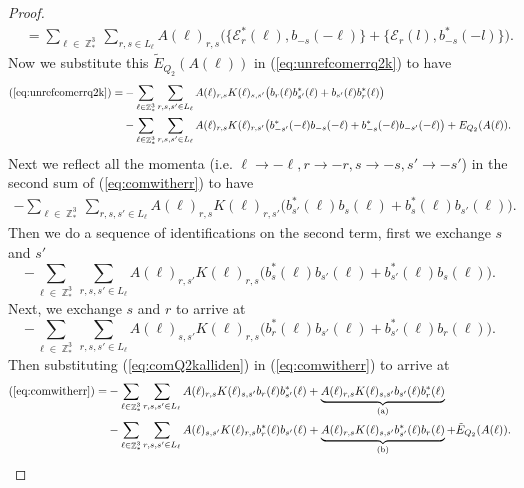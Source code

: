 \documentclass[sn-mathphys,Numbered, a4paper ,nocrop]{sn-jnl}%
\DeclareMathOperator{\Z}{\mathbb{Z}}
\theoremstyle{plain}
\theoremstyle{definition}
\theoremstyle{remark}
\theoremstyle{plain}
\theoremstyle{definition}
\theoremstyle{remark}
\begin{document}
\begin{proof}
\begin{align}
    &=\sum\limits_{\ell \in \Z^3_*}\sum\limits_{r,s \in L_{\ell}}A(\ell)_{r,s}\Big(\big\{\mathcal{E}^*_{r}(\ell), b_{-s}(-\ell)\big\} + \big\{\mathcal{E}_r(l), b^*_{-s}(-l)\big\}\Big).
\end{align}
Now we substitute this $\tilde E_{Q_2}(A(\ell)) $ in (\ref{eq:unrefcomerrq2k}) to have
\begin{align}
    (\ref{eq:unrefcomerrq2k})=&-\sum\limits_{\ell \in \Z^3_*}\sum\limits_{r,s,s' \in L_{\ell}}A(\ell)_{r,s}
        K(\ell)_{s,s'}\big(b_{r}(\ell)b^*_{s'}(\ell)+b_{s'}(\ell)b^*_{r}(\ell) \big)\nonumber\\ &-\sum\limits_{\ell \in \Z^3_*}\sum\limits_{r,s,s' \in L_{\ell}}A(\ell)_{r,s} K(\ell)_{r,s'}\big(b^*_{-s'}(-\ell)b_{-s}(-\ell) + b^*_{-s}(-\ell)b_{-s'}(-\ell)\big) + E_{Q_2}(A(\ell)).\label{eq:comwitherr}
\end{align}
Next we reflect all the momenta (i.e. $\ell\rightarrow -\ell,r\rightarrow -r,s\rightarrow -s,s'\rightarrow -s'$) in the second sum of (\ref{eq:comwitherr}) to have
\begin{align}
   -\sum\limits_{\ell \in \Z^3_*}\sum\limits_{r,s,s' \in L_{\ell}}A(\ell)_{r,s} K(\ell)_{r,s'}\big(b^*_{s'}(\ell)b_{s}(\ell) + b^*_{s}(\ell)b_{s'}(\ell)\big).
\end{align}
Then we do a sequence of identifications on the second term, first we exchange $s$ and $s'$ 
\begin{equation}
   -\sum\limits_{\ell \in \Z^3_*}\sum\limits_{r,s,s' \in L_{\ell}}A(\ell)_{r,s'} K(\ell)_{r,s}\big(b^*_{s}(\ell)b_{s'}(\ell) + b^*_{s'}(\ell)b_{s}(\ell)\big).
\end{equation}
Next, we exchange $s$ and $r$ to arrive at
\begin{equation}\label{eq:comQ2kalliden}
   -\sum\limits_{\ell \in \Z^3_*}\sum\limits_{r,s,s' \in L_{\ell}}A(\ell)_{s,s'} K(\ell)_{r,s}\big(b^*_{r}(\ell)b_{s'}(\ell) + b^*_{s'}(\ell)b_{r}(\ell)\big).
\end{equation}
Then substituting (\ref{eq:comQ2kalliden}) in (\ref{eq:comwitherr}) to arrive at
\begin{align}
    (\ref{eq:comwitherr})=&-\sum\limits_{\ell \in \Z^3_*}\sum\limits_{r,s,s' \in L_{\ell}}A(\ell)_{r,s}
        K(\ell)_{s,s'}b_{r}(\ell)b^*_{s'}(\ell)+\underbrace{A(\ell)_{r,s}
        K(\ell)_{s,s'}b_{s'}(\ell)b^*_{r}(\ell)}_{\text{(a)}}\nonumber\\ &-\sum\limits_{\ell \in \Z^3_*}\sum\limits_{r,s,s' \in L_{\ell}}A(\ell)_{s,s'} K(\ell)_{r,s}b^*_{r}(\ell)b_{s'}(\ell) + \underbrace{A(\ell)_{r,s}
        K(\ell)_{s,s'}b^*_{s'}(\ell)b_{r}(\ell)}_{\text{(b)}} + \tilde E_{Q_2}(A(\ell)).\label{eq:Q2k_before_anticom}

\end{align}
\end{proof}
\end{document}
